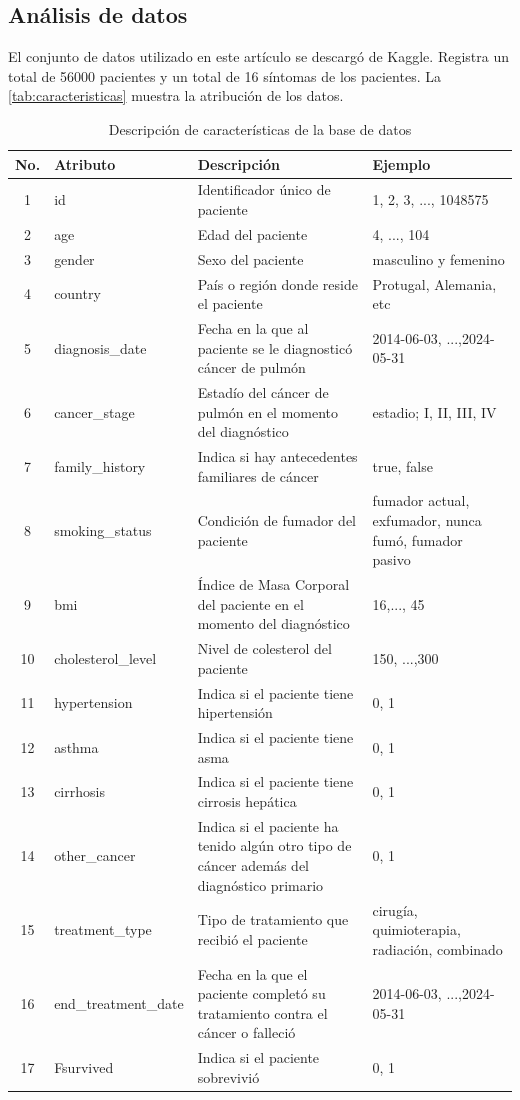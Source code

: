 \documentclass[10pt,journal,compsoc]{IEEEtran}
\begin{document}
\subsection{Análisis de datos}
El conjunto de datos utilizado en este artículo se descargó de Kaggle. Registra un total de 56000 pacientes y un total de 16 síntomas de los pacientes. La \autoref{tab:caracteristicas}   muestra la atribución de los datos.
\begin{table}[h!]
\centering
\begin{tabularx}{\columnwidth}{|c|X|X|X|}
\hline
\textbf{No.} & \textbf{Atributo} & \textbf{Descripción} & \textbf{Ejemplo} \\ \hline
1  & id & Identificador único de paciente &1, 2, 3, ..., 1048575 \\ \hline
2  & age & Edad del paciente & 4, ..., 104 \\ \hline
3  & gender & Sexo del paciente  & masculino y femenino \\ \hline
4  & country & País o región donde reside el paciente & Protugal, Alemania, etc  \\ \hline
5  & diagnosis\_date & Fecha en la que al paciente se le diagnosticó cáncer de pulmón & 2014-06-03, ...,2024-05-31 \\ \hline
6  & cancer\_stage & Estadío del cáncer de pulmón en el momento del diagnóstico & estadio; I,  II, III, IV \\ \hline
7  & family\_history & Indica si hay antecedentes familiares de cáncer & true, false \\ \hline
8  & smoking\_status & Condición de fumador del paciente &  fumador actual, exfumador, nunca fumó, fumador pasivo\\ \hline
9  & bmi & Índice de Masa Corporal del paciente en el momento del diagnóstico & 16,..., 45 \\ \hline
10 & cholesterol\_level & Nivel de colesterol del paciente & 150, ...,300 \\ \hline
11 & hypertension & Indica si el paciente tiene hipertensión & 0, 1 \\ \hline
12 & asthma & Indica si el paciente tiene asma &  0, 1 \\ \hline
13 & cirrhosis & Indica si el paciente tiene cirrosis hepática & 0, 1 \\ \hline
14 & other\_cancer & Indica si el paciente ha tenido algún otro tipo de cáncer además del diagnóstico primario & 0, 1 \\ \hline
15 & treatment\_type & Tipo de tratamiento que recibió el paciente & cirugía, quimioterapia, radiación, combinado \\ \hline
16 & end\_treatment\_date & Fecha en la que el paciente completó su tratamiento contra el cáncer o falleció & 2014-06-03, ...,2024-05-31 \\ \hline
17 & Fsurvived & Indica si el paciente sobrevivió & 0, 1 \\ \hline
\end{tabularx}
\caption{Descripción de características de la base de datos}
\label{tab:caracteristicas}
\end{table}
\end{document}
